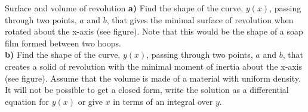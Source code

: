 \begin{problem}{Surface and volume of revolution}\label{prob_CalcVar_9}
\textbf{a)} Find the shape of the curve, $y(x)$, passing through two points, $a$ and $b$, that gives the minimal surface of revolution when rotated about the x-axis (see figure). Note that this would be the shape of a soap film formed between two hoops.\\
\textbf{b)} Find the shape of the curve, $y(x)$, passing through two points, $a$ and $b$, that creates a solid of revolution with the minimal moment of inertia about the x-axis (see figure). Assume that the volume is made of a material with uniform density. It will not be possible to get a closed form, write the solution as a differential equation for $y(x)$ or give $x$ in terms of an integral over $y$.
\\
\end{problem}


